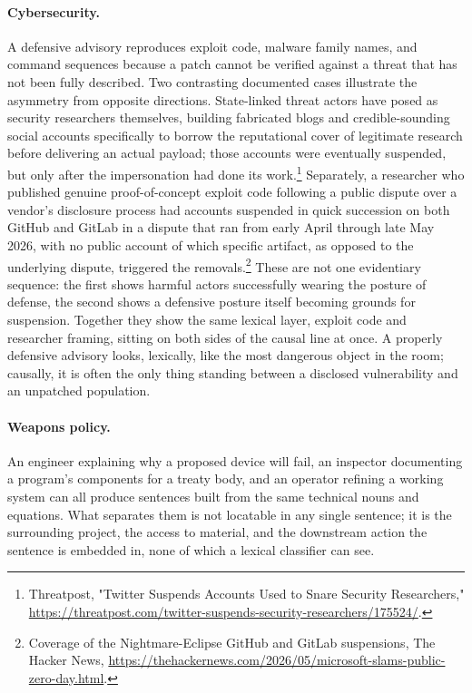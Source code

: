 \documentclass[11pt]{article}
\begin{document}
\paragraph{Cybersecurity.} A defensive advisory reproduces exploit code, malware family names, and command sequences because a patch cannot be verified against a threat that has not been fully described. Two contrasting documented cases illustrate the asymmetry from opposite directions. State-linked threat actors have posed as security researchers themselves, building fabricated blogs and credible-sounding social accounts specifically to borrow the reputational cover of legitimate research before delivering an actual payload; those accounts were eventually suspended, but only after the impersonation had done its work.\footnote{Threatpost, "Twitter Suspends Accounts Used to Snare Security Researchers," \url{https://threatpost.com/twitter-suspends-security-researchers/175524/}.} Separately, a researcher who published genuine proof-of-concept exploit code following a public dispute over a vendor's disclosure process had accounts suspended in quick succession on both GitHub and GitLab in a dispute that ran from early April through late May 2026, with no public account of which specific artifact, as opposed to the underlying dispute, triggered the removals.\footnote{Coverage of the Nightmare-Eclipse GitHub and GitLab suspensions, The Hacker News, \url{https://thehackernews.com/2026/05/microsoft-slams-public-zero-day.html}.} These are not one evidentiary sequence: the first shows harmful actors successfully wearing the posture of defense, the second shows a defensive posture itself becoming grounds for suspension. Together they show the same lexical layer, exploit code and researcher framing, sitting on both sides of the causal line at once. A properly defensive advisory looks, lexically, like the most dangerous object in the room; causally, it is often the only thing standing between a disclosed vulnerability and an unpatched population.

\paragraph{Weapons policy.} An engineer explaining why a proposed device will fail, an inspector documenting a program's components for a treaty body, and an operator refining a working system can all produce sentences built from the same technical nouns and equations. What separates them is not locatable in any single sentence; it is the surrounding project, the access to material, and the downstream action the sentence is embedded in, none of which a lexical classifier can see.
\end{document}
